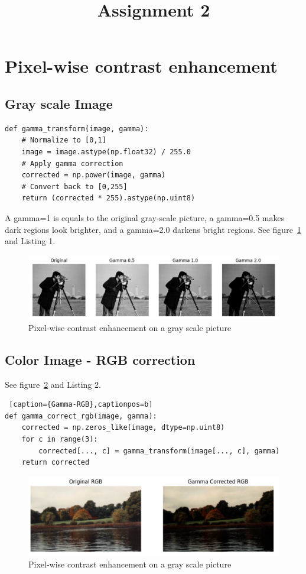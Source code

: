 \documentclass[12pt]{article}
\title{Assignment 2}
\begin{document}
\maketitle

\section{Pixel-wise contrast enhancement}
\subsection{Gray scale Image}
\begin{lstlisting}[caption={Gamma-Prime},captionpos=b]
def gamma_transform(image, gamma):
    # Normalize to [0,1]
    image = image.astype(np.float32) / 255.0 
    # Apply gamma correction
    corrected = np.power(image, gamma) 
    # Convert back to [0,255]
    return (corrected * 255).astype(np.uint8) 
\end{lstlisting}

A gamma=1 is equals to the original gray-scale picture, a gamma=0.5 makes dark regions look brighter, and a gamma=2.0 darkens bright regions. See figure~\ref{fig:1.1} and Listing 1.

\begin{figure}[ht]
\centering
    \includegraphics[width=0.7\columnwidth, keepaspectratio]{pics/a2-1.1}
\caption[]{Pixel-wise contrast enhancement on a gray scale picture}
\label{fig:1.1}
\end{figure}

\subsection{Color Image - RGB correction}

 See figure~\ref{fig:1.2} and Listing 2.

\begin{lstlisting} [caption={Gamma-RGB},captionpos=b]
def gamma_correct_rgb(image, gamma):
    corrected = np.zeros_like(image, dtype=np.uint8)
    for c in range(3): 
        corrected[..., c] = gamma_transform(image[..., c], gamma)
    return corrected
\end{lstlisting}
\begin{figure}[ht]
\centering
    \includegraphics[width=0.7\columnwidth, keepaspectratio]{pics/a2-1.2}
\caption[]{Pixel-wise contrast enhancement on a gray scale picture}
\label{fig:1.2}
\end{figure}
\end{document}
